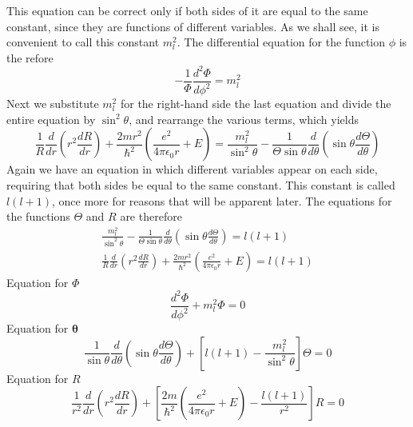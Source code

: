 This equation can be correct only if both sides of it are equal to the same constant, since they are functions of different variables. As we shall see, it is convenient to call this constant $m_{l}^{2}$. The differential equation for the function $\phi$ is the refore
$$
-\frac{1}{\Phi} \frac{d^{2} \Phi}{d \phi^{2}}=m_{l}^{2}
$$
Next we substitute $m_{l}^{2}$ for the right-hand side the last equation and divide the entire equation by $\sin ^{2} \theta$, and rearrange the various terms, which yields
$$
\frac{1}{R} \frac{d}{d r}\left(r^{2} \frac{d R}{d r}\right)+\frac{2 m r^{2}}{\hbar^{2}}\left(\frac{e^{2}}{4 \pi \epsilon_{0} r}+E\right)=\frac{m_{l}^{2}}{\sin ^{2} \theta}-\frac{1}{\Theta \sin \theta} \frac{d}{d \theta}\left(\sin \theta \frac{d \Theta}{d \theta}\right)
$$
Again we have an equation in which different variables appear on each side, requiring that both sides be equal to the same constant. This constant is called $l(l+1)$, once more for reasons that will be apparent later. The equations for the functions $\Theta$ and $R$ are therefore\\
$$\begin{gathered}
\frac{m_{l}^{2}}{\sin ^{2} \theta}-\frac{1}{\Theta \sin \theta} \frac{d}{d \theta}\left(\sin \theta \frac{d \Theta}{d \theta}\right)=l(l+1) \\
\frac{1}{R} \frac{d}{d r}\left(r^{2} \frac{d R}{d r}\right)+\frac{2 m r^{2}}{\hbar^{2}}\left(\frac{e^{2}}{4 \pi \epsilon_{0} r}+E\right)=l(l+1)
\end{gathered}$$
Equation for $\Phi$ $$\frac{d^{2} \Phi}{d \phi^{2}}+m_{l}^{2} \Phi=0$$
Equation
for $\boldsymbol{\theta}$
$$\frac{1}{\sin \theta} \frac{d}{d \theta}\left(\sin \theta \frac{d \Theta}{d \theta}\right)+\left[l(l+1)-\frac{m_{l}^{2}}{\sin ^{2} \theta}\right] \Theta=0$$
Equation
for $R$
$$\frac{1}{r^{2}} \frac{d}{d r}\left(r^{2} \frac{d R}{d r}\right)+\left[\frac{2 m}{\hbar^{2}}\left(\frac{e^{2}}{4 \pi \epsilon_{0} r}+E\right)-\frac{l(l+1)}{r^{2}}\right] R=0$$

